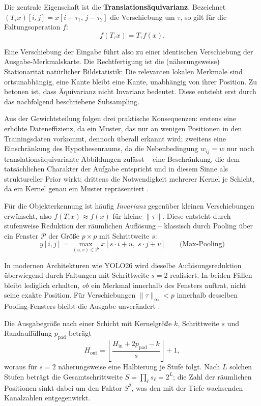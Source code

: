 Die zentrale Eigenschaft ist die \textbf{Translationsäquivarianz}. Bezeichnet
$(T_\tau x)[i,j] = x[i-\tau_1,\,j-\tau_2]$ die Verschiebung um $\tau$, so gilt
für die Faltungsoperation $f$:
\begin{equation}
f(T_\tau x) = T_\tau f(x).
\label{eq:aequivarianz}
\end{equation}

Eine Verschiebung der Eingabe führt also zu einer identischen Verschiebung der
Ausgabe-Merkmalskarte. Die Rechtfertigung ist die (näherungsweise) Stationarität
natürlicher Bildstatistik: Die relevanten lokalen Merkmale sind ortsunabhängig,
eine Kante bleibt eine Kante, unabhängig von ihrer Position. Zu betonen ist,
dass Äquivarianz nicht Invarianz bedeutet. Diese entsteht erst durch das
nachfolgend beschriebene Subsampling.

Aus der Gewichtsteilung folgen drei praktische Konsequenzen: erstens eine
erhöhte Dateneffizienz, da ein Muster, das nur an wenigen Positionen in den
Trainingsdaten vorkommt, dennoch überall erkannt wird; zweitens eine
Einschränkung des Hypothesenraums, da die Nebenbedingung $w_{ij} = w$ nur noch
translationsäquivariante Abbildungen zulässt -- eine Beschränkung, die dem
tatsächlichen Charakter der Aufgabe entspricht und in diesem Sinne als
struktureller Prior wirkt; drittens die Notwendigkeit mehrerer Kernel je
Schicht, da ein Kernel genau ein Muster repräsentiert
\parencite{lecun1998,goodfellow2016}.

 Für die Objekterkennung ist häufig
\emph{Invarianz} gegenüber kleinen Verschiebungen erwünscht, also
$f(T_\tau x) \approx f(x)$ für kleine $\|\tau\|$. Diese entsteht durch
stufenweise Reduktion der räumlichen Auflösung -- klassisch durch Pooling über
ein Fenster $\mathcal{P}$ der Größe $p \times p$ mit Schrittweite $s$:
\begin{equation}
y[i,j] = \max_{(u,v)\in\mathcal{P}} x[s\cdot i + u,\; s\cdot j + v]
\qquad \text{(Max-Pooling)}
\end{equation}

In modernen Architekturen wie YOLO26 wird dieselbe Auflösungsreduktion
überwiegend durch Faltungen mit Schrittweite $s = 2$ realisiert. In beiden Fällen
bleibt lediglich erhalten, \emph{ob} ein Merkmal innerhalb des Fensters auftrat,
nicht seine exakte Position. Für Verschiebungen $\|\tau\|_\infty < p$ innerhalb
desselben Pooling-Fensters bleibt die Ausgabe unverändert
\parencite{lecun1998,goodfellow2016}.

Die Ausgabegröße nach einer Schicht mit Kernelgröße $k$, Schrittweite $s$ und
Randauffüllung $p_{\text{pad}}$ beträgt
\begin{equation}
H_{\text{out}} = \left\lfloor
\frac{H_{\text{in}} + 2p_{\text{pad}} - k}{s} \right\rfloor + 1,
\end{equation}
woraus für $s = 2$ näherungsweise eine Halbierung je Stufe folgt. Nach $L$
solchen Stufen beträgt die Gesamtschrittweite $S = \prod_{\ell} s_\ell = 2^L$;
die Zahl der räumlichen Positionen sinkt dabei um den Faktor $S^2$, was den mit
der Tiefe wachsenden Kanalzahlen entgegenwirkt.


